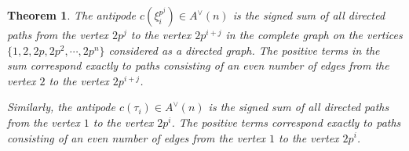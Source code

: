 \documentclass{amsart}
\newtheorem{theorem}{Theorem}[section]
\theoremstyle{definition}
\theoremstyle{plain}
\numberwithin{theorem}{section}
\numberwithin{equation}{section}
\numberwithin{figure}{section}
\newcommand{\0}{\langle 0 \rangle }
\begin{document}
\begin{theorem} \label{thm:AntipodeOdd} 
    The antipode $c(\xi_i^{p^j}) \in A^\vee(n)$ is the signed sum of all directed paths from the vertex $2 p^j$ to the vertex $2 p^{i + j}$ in the complete graph on the vertices $\{1,2, 2p, 2p^2, \cdots, 2p^n\}$ considered as a directed graph. The positive terms in the sum correspond exactly to paths consisting of an even number of edges from the vertex $2$ to the vertex $2p^{i +j}$.

    Similarly, the antipode $c(\tau_i) \in A^\vee(n)$ is the signed sum of all directed paths from the vertex $1$ to the vertex $2 p^{i}$. The positive terms correspond exactly to paths consisting of an even number of edges from the vertex $1$ to the vertex $2 p^i$. \color{black}
\end{theorem} 
\end{document}
